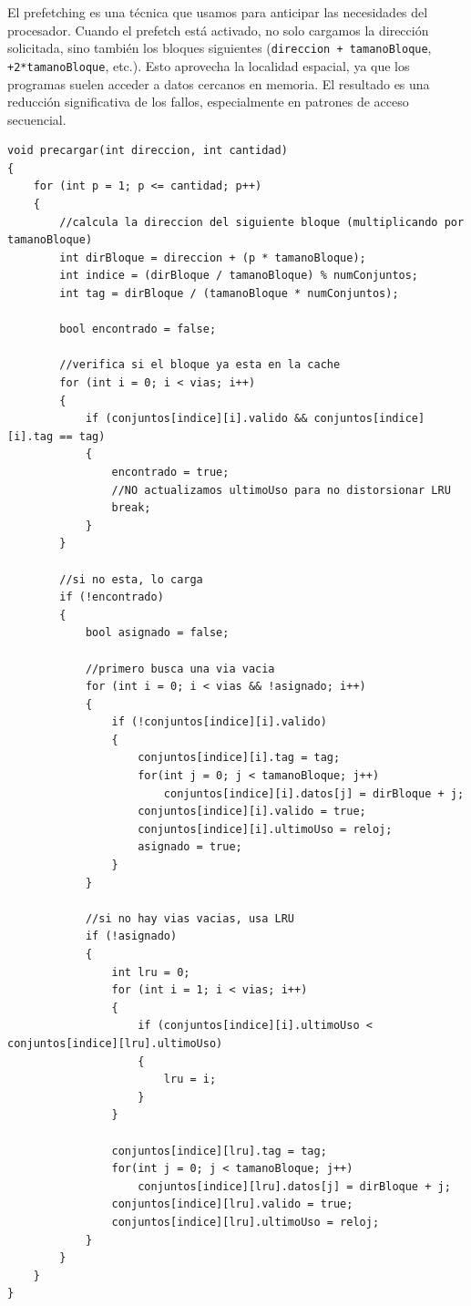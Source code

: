 \documentclass[14pt]{article}
\begin{document}
El prefetching es una técnica que usamos para anticipar las necesidades del procesador. Cuando el prefetch está activado, no solo cargamos la dirección solicitada, sino también los bloques siguientes (\texttt{direccion + tamanoBloque}, \texttt{+2*tamanoBloque}, etc.). Esto aprovecha la localidad espacial, ya que los programas suelen acceder a datos cercanos en memoria. El resultado es una reducción significativa de los fallos, especialmente en patrones de acceso secuencial.

\begin{lstlisting}
void precargar(int direccion, int cantidad)
{
    for (int p = 1; p <= cantidad; p++)
    {
        //calcula la direccion del siguiente bloque (multiplicando por tamanoBloque)
        int dirBloque = direccion + (p * tamanoBloque);
        int indice = (dirBloque / tamanoBloque) % numConjuntos;
        int tag = dirBloque / (tamanoBloque * numConjuntos);
        
        bool encontrado = false;

        //verifica si el bloque ya esta en la cache
        for (int i = 0; i < vias; i++)
        {
            if (conjuntos[indice][i].valido && conjuntos[indice][i].tag == tag)
            {
                encontrado = true;
                //NO actualizamos ultimoUso para no distorsionar LRU
                break;
            }
        }
        
        //si no esta, lo carga
        if (!encontrado)
        {
            bool asignado = false;
            
            //primero busca una via vacia
            for (int i = 0; i < vias && !asignado; i++)
            {
                if (!conjuntos[indice][i].valido)
                {
                    conjuntos[indice][i].tag = tag;
                    for(int j = 0; j < tamanoBloque; j++)
                        conjuntos[indice][i].datos[j] = dirBloque + j;
                    conjuntos[indice][i].valido = true;
                    conjuntos[indice][i].ultimoUso = reloj;
                    asignado = true;
                }
            }
            
            //si no hay vias vacias, usa LRU
            if (!asignado)
            {
                int lru = 0;
                for (int i = 1; i < vias; i++)
                {
                    if (conjuntos[indice][i].ultimoUso < conjuntos[indice][lru].ultimoUso)
                    {
                        lru = i;
                    }
                }
                
                conjuntos[indice][lru].tag = tag;
                for(int j = 0; j < tamanoBloque; j++)
                    conjuntos[indice][lru].datos[j] = dirBloque + j;
                conjuntos[indice][lru].valido = true;
                conjuntos[indice][lru].ultimoUso = reloj;
            }
        }
    }
}
\end{lstlisting}
\end{document}
